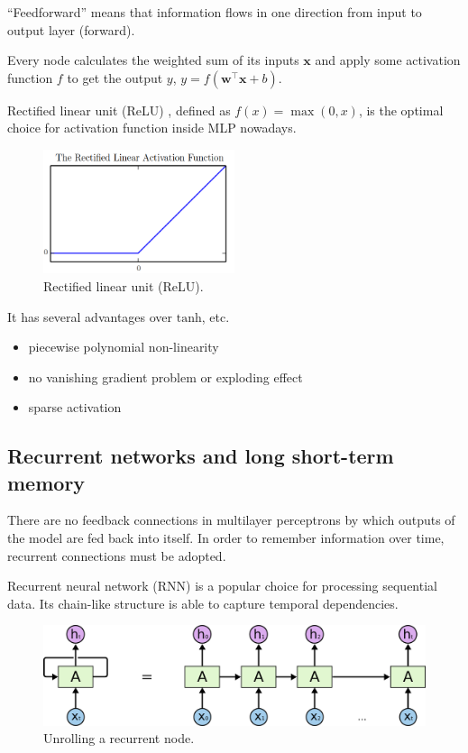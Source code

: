 \documentclass[11pt,a4paper]{report}
\begin{document}
\enquote{Feedforward} means that information flows in one direction from input to output layer (forward).

Every node calculates the weighted sum of its inputs \(\mathbf{x}\) and apply some activation function \(f\) to get the output \(y\), \( y = f (\mathbf{w}^\intercal \mathbf{x} + b) \).

\bigskip

Rectified linear unit (ReLU) \parencite{nair2010rectified}, defined as \(f(x) = \max(0, x)\), is the optimal choice for activation function inside MLP nowadays.

\begin{figure}[htbp]
  \centering
  \includegraphics[width=0.5\textwidth]{relu.png}
  \caption{Rectified linear unit (ReLU).} \label{fig:relu}
\end{figure}

It has several advantages over \(\mathrm{tanh}\), etc.

\begin{itemize}
  \item piecewise polynomial non-linearity
  \item no vanishing gradient problem or exploding effect
  \item sparse activation
\end{itemize}

\subsection{Recurrent networks and long short-term memory}

There are no feedback connections in multilayer perceptrons by which outputs of the model are fed back into itself.
In order to remember information over time, recurrent connections must be adopted.

Recurrent neural network (RNN) is a popular choice for processing sequential data.
Its chain-like structure is able to capture temporal dependencies.

\begin{figure}[htbp]
  \centering
  \includegraphics[width=\textwidth]{RNN-unrolled.png}
  \caption{Unrolling a recurrent node.} \label{fig:rnn-intro}
\end{figure}
\end{document}
